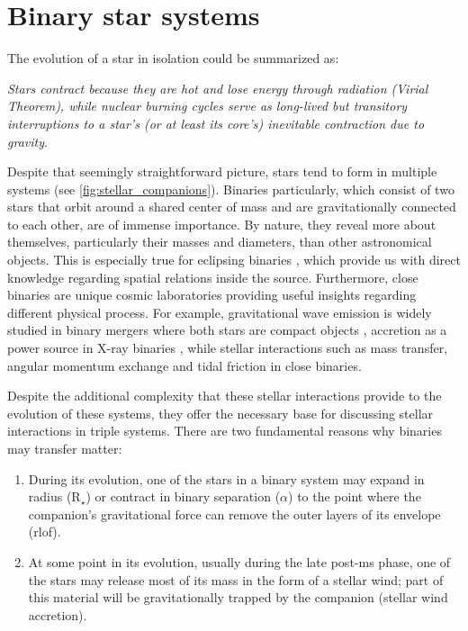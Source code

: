\section{Binary star systems}\label{sec:binary_evolution}

The evolution of a star in isolation could be summarized as:

{\it Stars contract because they are hot and lose energy through radiation (Virial Theorem), while nuclear burning cycles serve as long-lived but transitory interruptions to a star's (or at least its core's) inevitable contraction due to gravity}. 

Despite that seemingly straightforward picture, stars tend to form in multiple systems (see \cref{fig:stellar_companions}). Binaries particularly, which consist of two stars that orbit around a shared center of mass and are gravitationally connected to each other, are of immense importance. By nature, they reveal more about themselves, particularly their masses and diameters, than other astronomical objects. This is especially true for eclipsing binaries \citep{prvsa2016physics}, which provide us with direct knowledge regarding spatial relations inside the source. Furthermore, close binaries are unique cosmic laboratories providing useful insights regarding different physical process. For example, gravitational wave emission is widely studied in binary mergers where both stars are compact objects \citep{cutler1994gravitational,abbott2017gw170608,abbott2019gwtc}, accretion as a power source in X-ray binaries \citep{lewin1997x,reig2011x}, while stellar interactions such as mass transfer, angular momentum exchange and tidal friction in close binaries. 

Despite the additional complexity that these stellar interactions provide to the evolution of these systems, they offer the necessary base for discussing stellar interactions in triple systems. There are two fundamental reasons why binaries may transfer matter:
\begin{enumerate}
    \item During its evolution, one of the stars in a binary system may expand in radius (R$_{\star}$) or contract in binary separation (${\alpha}$) to the point where the companion's gravitational force can remove the outer layers of its envelope (\ac{rlof}).
    \item At some point in its evolution, usually during the late post-\ac{ms} phase, one of the stars may release most of its mass in the form of a stellar wind; part of this material will be gravitationally trapped by the companion (stellar wind accretion). 
\end{enumerate}

